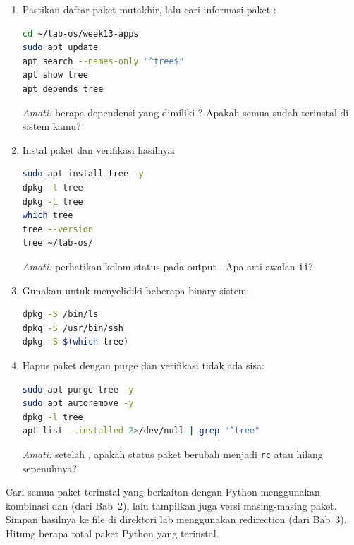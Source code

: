 \begin{enumerate}
    \item Pastikan daftar paket mutakhir, lalu cari informasi paket :
\begin{lstlisting}[language=bash, caption={Perbarui dan cari informasi paket}]
cd ~/lab-os/week13-apps
sudo apt update
apt search --names-only "^tree$"
apt show tree
apt depends tree
\end{lstlisting}
    \textit{Amati:} berapa dependensi yang dimiliki ? Apakah semua
    sudah terinstal di sistem kamu?

    \item Instal paket  dan verifikasi hasilnya:
\begin{lstlisting}[language=bash, caption={Instal dan verifikasi paket tree}]
sudo apt install tree -y
dpkg -l tree
dpkg -L tree
which tree
tree --version
tree ~/lab-os/
\end{lstlisting}
    \textit{Amati:} perhatikan kolom status pada output . Apa arti
    awalan \texttt{ii}?

    \item Gunakan  untuk menyelidiki beberapa binary sistem:
\begin{lstlisting}[language=bash, caption={Mencari paket pemilik file}]
dpkg -S /bin/ls
dpkg -S /usr/bin/ssh
dpkg -S $(which tree)
\end{lstlisting}

    \item Hapus paket  dengan purge dan verifikasi tidak ada sisa:
\begin{lstlisting}[language=bash, caption={Hapus paket dan verifikasi sisa}]
sudo apt purge tree -y
sudo apt autoremove -y
dpkg -l tree
apt list --installed 2>/dev/null | grep "^tree"
\end{lstlisting}
    \textit{Amati:} setelah , apakah status paket berubah menjadi
    \texttt{rc} atau hilang sepenuhnya?
\end{enumerate}

\begin{challengebox}
Cari semua paket terinstal yang berkaitan dengan Python menggunakan kombinasi
 dan  (dari Bab~2), lalu tampilkan juga
versi masing-masing paket. Simpan hasilnya ke file 
di direktori lab menggunakan redirection (dari Bab~3). Hitung berapa total
paket Python yang terinstal.
\end{challengebox}

